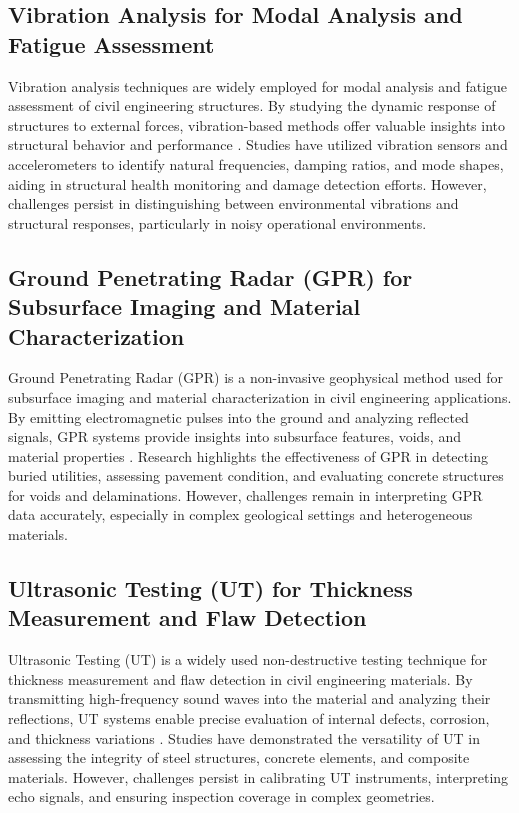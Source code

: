 \documentclass[journal, a4paper]{IEEEtran}
\begin{document}
\subsection{Vibration Analysis for Modal Analysis and Fatigue Assessment}
Vibration analysis techniques are widely employed for modal analysis and fatigue assessment of civil engineering structures.
By studying the dynamic response of structures to external forces, vibration-based methods offer valuable insights into structural
behavior and performance \cite{carcione_demodulation_2020} \cite{de_sa_rodrigues_probability_2023} \cite{zhang_defect_2020}. Studies have utilized vibration sensors and accelerometers to identify natural
frequencies, damping ratios, and mode shapes, aiding in structural health monitoring and damage detection efforts.
However, challenges persist in distinguishing between environmental vibrations and structural responses,
particularly in noisy operational environments. 

\subsection{Ground Penetrating Radar (GPR) for Subsurface Imaging and Material Characterization}
Ground Penetrating Radar (GPR) is a non-invasive geophysical method used for subsurface imaging and
material characterization in civil engineering applications. By emitting electromagnetic pulses into the
ground and analyzing reflected signals, GPR systems provide insights into subsurface features, voids,
and material properties \cite{balasubramaniam_multi_2022} \cite{tang_explainable_2023} \cite{katunin_identification_2021}.
Research highlights the effectiveness of GPR in detecting buried utilities,
assessing pavement condition, and evaluating concrete structures for voids and delaminations. However,
challenges remain in interpreting GPR data accurately, especially in complex geological settings and heterogeneous materials.

\subsection{Ultrasonic Testing (UT) for Thickness Measurement and Flaw Detection}
Ultrasonic Testing (UT) is a widely used non-destructive testing technique for thickness measurement
and flaw detection in civil engineering materials. By transmitting high-frequency sound waves into the
material and analyzing their reflections, UT systems enable precise evaluation of internal defects,
corrosion, and thickness variations \cite{lambinet_measurement_2022} \cite{zhang_spatial_2023} \cite{li_physics-informed_2023}.
Studies have demonstrated the versatility of UT
in assessing the integrity of steel structures, concrete elements, and composite materials.
However, challenges persist in calibrating UT instruments, interpreting echo signals, and ensuring inspection coverage
in complex geometries. 
\end{document}
